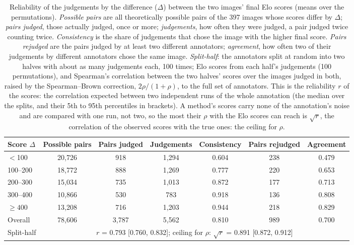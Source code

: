 \begin{table}[htbp]
  \centering
  \caption{Reliability of the judgements by the difference ($\Delta$) between the two images' final Elo scores (means over the permutations). \emph{Possible pairs} are all theoretically possible pairs of the 397 images whose scores differ by $\Delta$; \emph{pairs judged}, those actually judged, once or more; \emph{judgements}, how often they were judged, a pair judged twice counting twice. \emph{Consistency} is the share of judgements that chose the image with the higher final score. \emph{Pairs rejudged} are the pairs judged by at least two different annotators; \emph{agreement}, how often two of their judgements by different annotators chose the same image. \emph{Split-half}: the annotators split at random into two halves with about as many judgements each, 100 times; Elo scores from each half's judgements (100 permutations), and Spearman's correlation between the two halves' scores over the images judged in both, raised by the Spearman--Brown correction, $2\rho/(1+\rho)$, to the full set of annotators. This is the reliability $r$ of the scores: the correlation expected between two independent runs of the whole annotation (the median over the splits, and their 5th to 95th percentiles in brackets). A method's scores carry none of the annotation's noise and are compared with one run, not two, so the most their $\rho$ with the Elo scores can reach is $\sqrt{r}$, the correlation of the observed scores with the true ones: the ceiling for $\rho$.}
  \label{tab:reliability_by_elo_gap}
  \begin{tabular}{lcccccc}
    \toprule
    Score $\Delta$ & Possible pairs & Pairs judged & Judgements & Consistency & Pairs rejudged & Agreement \\
    \midrule
    $<$100 & 20,726 & 918 & 1,294 & 0.604 & 238 & 0.479 \\
    100--200 & 18,772 & 888 & 1,269 & 0.777 & 220 & 0.653 \\
    200--300 & 15,034 & 735 & 1,013 & 0.872 & 177 & 0.713 \\
    300--400 & 10,866 & 530 & 783 & 0.918 & 136 & 0.808 \\
    $\geq 400$ & 13,208 & 716 & 1,203 & 0.944 & 218 & 0.829 \\
    \midrule
    Overall & 78,606 & 3,787 & 5,562 & 0.810 & 989 & 0.700 \\
    \midrule
    Split-half & \multicolumn{6}{c}{$r$ = 0.793 [0.760, 0.832]; ceiling for $\rho$: $\sqrt{r}$ = 0.891 [0.872, 0.912]} \\
    \bottomrule
  \end{tabular}
\end{table}
